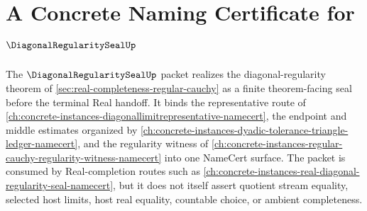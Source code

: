 \chapter{A Concrete Naming Certificate for $\DiagonalRegularitySealUp$}
\label{ch:concrete-instances-diagonalregularityseal-namecert}

The $\DiagonalRegularitySealUp$ packet realizes the diagonal-regularity theorem of \autoref{sec:real-completeness-regular-cauchy} as a finite theorem-facing seal before the terminal Real handoff. It binds the representative route of \autoref{ch:concrete-instances-diagonallimitrepresentative-namecert}, the endpoint and middle estimates organized by \autoref{ch:concrete-instances-dyadic-tolerance-triangle-ledger-namecert}, and the regularity witness of \autoref{ch:concrete-instances-regular-cauchy-regularity-witness-namecert} into one NameCert surface. The packet is consumed by Real-completion routes such as \autoref{ch:concrete-instances-real-diagonal-regularity-seal-namecert}, but it does not itself assert quotient stream equality, selected host limits, host real equality, countable choice, or ambient completeness.

